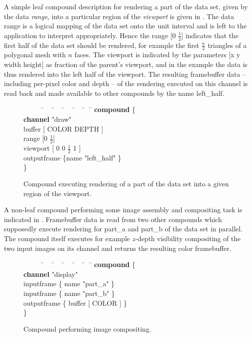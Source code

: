 A simple leaf compound description for rendering a part of the data set, given
by the data {\em range}, into a particular region of the {\em viewport} is given
in . The data range is a logical mapping of the data set
onto the unit interval and is left to the application to interpret
appropriately. Hence  the range [0 $\frac{1}{2}$] indicates that the first half
of the data set should be rendered, for example the first $\frac{n}{2}$
triangles of a polygonal mesh with $n$ faces. The viewport is indicated by the
parameters [x y width height] as fraction of the parent's viewport, and in the
example the data is thus rendered into the left half of the viewport. The
resulting framebuffer data -- including per-pixel color and depth -- of the
rendering executed on this channel is read back and made available to other
compounds by the name left\_half.

\begin{figure}[ht]\center
 {\begin{tabbing} \ \ \ \ \ \=\ \ \ \=\ \ \ \=\ \ \ \=\ \ \ \=\ \ \ \= \kill
   \> {\bf compound} \{						\\
   \>\> {\bf channel} "draw"					\\
   \>\> buffer  [ COLOR DEPTH ]				\\
   \>\> range [0 $\frac{1}{2}$]				\\
   \>\> viewport [ 0 0 $\frac{1}{2}$ 1 ]                 \\
   \>\> outputframe \{name "left\_half" \}	\\
   \> \}
  \end{tabbing}}
 \vspace{-2mm}
 \caption{Compound executing rendering of a part of the data set into a given region of the viewport.\label{FIG_leaf_compound}}
\end{figure}

A non-leaf compound performing some image assembly and compositing task is
indicated in . Framebuffer data is read from two other
compounds which supposedly execute rendering for part\_a and part\_b of the data
set in parallel. The compound itself executes for example $z$-depth visibility
compositing of the two input images on its channel and returns the resulting
color framebuffer.

\begin{figure}[ht]\center
 {\begin{tabbing} \ \ \ \ \ \=\ \ \ \=\ \ \ \=\ \ \ \=\ \ \ \=\ \ \ \= \kill
   \> {\bf compound} \{						\\
   \>\> {\bf channel} "display"				\\
   \>\> inputframe \{ name "part\_a" \}			\\
   \>\> inputframe \{ name "part\_b" \}			\\
   \>\> outputframe \{ buffer [ COLOR ] \}	\\
   \> \}
  \end{tabbing}}
 \vspace{-2mm}
 \caption{Compound performing image compositing.\label{FIG_inner_compound}}
\end{figure}

